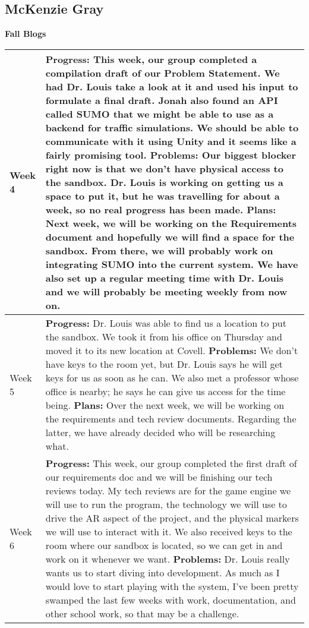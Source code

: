 \documentclass[letterpaper, 10pt, onecolumn, draftclsnofoot]{IEEEtran}
\begin{document}
    \subsection{McKenzie Gray}
        \begin{center}
        \large{\textbf{Fall Blogs}} \\
        \begin{longtable}{|p{4cm}|p{10cm}|}
            \hline
            Week 4 & \textbf{Progress:} This week, our group completed a compilation draft of our Problem Statement. We had Dr. Louis take a look at it and used his input to formulate a final draft. Jonah also found an API called SUMO that we might be able to use as a backend for traffic simulations. We should be able to communicate with it using Unity and it seems like a fairly promising tool.
            \textbf{Problems:} Our biggest blocker right now is that we don't have physical access to the sandbox. Dr. Louis is working on getting us a space to put it, but he was travelling for about a week, so no real progress has been made.
            \textbf{Plans:} Next week, we will be working on the Requirements document and hopefully we will find a space for the sandbox. From there, we will probably work on integrating SUMO into the current system. We have also set up a regular meeting time with Dr. Louis and we will probably be meeting weekly from now on.\\
            \hline
            Week 5 & \textbf{Progress:} Dr. Louis was able to find us a location to put the sandbox. We took it from his office on Thursday and moved it to its new location at Covell.
            \textbf{Problems:} We don't have keys to the room yet, but Dr. Louis says he will get keys for us as soon as he can. We also met a professor whose office is nearby; he says he can give us access for the time being.
            \textbf{Plans:} Over the next week, we will be working on the requirements and tech review documents. Regarding the latter, we have already decided who will be researching what.\\
            \hline
            Week 6 & \textbf{Progress:} This week, our group completed the first draft of our requirements doc and we will be finishing our tech reviews today. My tech reviews are for the game engine we will use to run the program, the technology we will use to drive the AR aspect of the project, and the physical markers we will use to interact with it. We also received keys to the room where our sandbox is located, so we can get in and work on it whenever we want.
            \textbf{Problems:} Dr. Louis really wants us to start diving into development. As much as I would love to start playing with the system, I've been pretty swamped the last few weeks with work, documentation, and other school work, so that may be a challenge.

\end{longtable}
\end{center}
\end{document}
